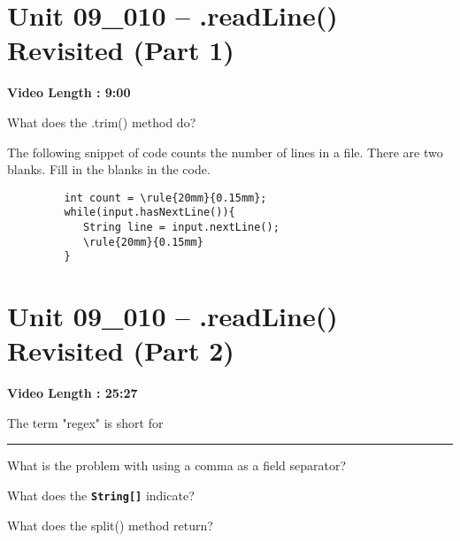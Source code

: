 \documentclass[letterpaper,12pt]{exam}
\newcommand{\unit}{Unit 09}
\begin{document}
\section*{\unit\_010 -- .readLine() Revisited (Part 1)} 
\par{\selectfont\textbf{Video Length : 9:00}}
\begin{questions}
\begin{samepage}
    \question What does the .trim() method do?
    \vspace{5mm}
\end{samepage}

\begin{samepage}
    \question The following snippet of code counts the number of lines in a file.  There are two blanks.  Fill in the blanks in the code.
    \begin{verbatim}
         int count = \rule{20mm}{0.15mm};
         while(input.hasNextLine()){
            String line = input.nextLine();
            \rule{20mm}{0.15mm}
         }    
    \end{verbatim}
    \vspace{5mm}
\end{samepage}


\section*{\unit\_010 -- .readLine() Revisited (Part 2)} 
\par{\selectfont\textbf{Video Length : 25:27}}

\begin{samepage}
    \question The term "regex" is short for \rule{50mm}{0.15mm}
    \vspace{5mm}
\end{samepage}

\begin{samepage}
    \question What is the problem with using a comma as a field separator?
    \vspace{5mm}
\end{samepage}


\begin{samepage}
    \question What does the \texttt{\textbf{String[]}} indicate?
    \vspace{5mm}
\end{samepage}

\begin{samepage}
    \question What does the split() method return?
    \vspace{5mm}
\end{samepage}


\end{questions}
\end{document}
